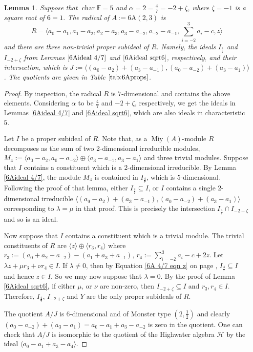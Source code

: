 \documentclass[11pt, a4paper]{article}
\theoremstyle{plain}
\newtheorem{lemma}[theorem]{Lemma}
\theoremstyle{definition}
\newcommand\al{\alpha}
\newcommand\lm{\lambda}
\newcommand\la{\langle}
\newcommand\ra{\rangle}
\DeclareMathOperator{\ch}{char}
\newcommand\FF{\mathbb{F}}
\newcommand{\A}{\mathrm{A}}
\DeclareMathOperator{\Miy}{Miy}
\newcommand{\cH}{\mathcal{H}}
\newcommand{\0}{\overline{0}}
\newcommand{\2}{\overline{2}}
\newcommand{\1}{\mathbbm{1}}
\begin{document}
\begin{lemma}
Suppose that $\ch \FF = 5$ and $\al = 2 = \tfrac{4}{7} = -2+\zeta$, where $\zeta = -1$ is a square root of $6=1$.  The radical of $A := 6\A(2, 3)$ is
\[
	R = \la a_0 -a_1, a_1-a_2, a_2-a_3, a_3-a_{-2}, a_{-2} -a_{-1}, \sum_{i=-2}^3 a_i -c, z  \ra 
\]
and there are three non-trivial proper subideal of $R$.  Namely, the ideals $I_{\frac{4}{7}}$ and $I_{-2+\zeta}$ from Lemmas $\ref{6Aideal 4/7}$ and $\ref{6Aideal sqrt6}$, respectively, and their intersection, which is $J :=  \la (a_0 -a_2)+(a_3-a_{-1}), (a_0 - a_{-2}) +  (a_3-a_1) \ra$.  The quotients are given in Table $\ref{tab:6Aprops}$.
\end{lemma}
\begin{proof}
By inspection, the radical $R$ is $7$-dimensional and contains the above elements.  Considering $\al$ to be $\frac{4}{7}$ and $-2+\zeta$, respectively, we get the ideals in Lemmas \ref{6Aideal 4/7} and \ref{6Aideal sqrt6}, which are also ideals in characteristic $5$.

Let $I$ be a proper subideal of $R$.  Note that, as a $\Miy(A)$-module $R$ decomposes as the sum of two $2$-dimensional irreducible modules, $M_4 := \la  a_0-a_2, a_0-a_{-2}\ra\oplus \la a_3-a_{-1}, a_3-a_1\ra$ and three trivial modules.  Suppose that $I$ contains a constituent which is a $2$-dimensional irreducible.  By Lemma \ref{6Aideal 4/7}, the module $M_4$ is contained in $I_{\frac{4}{7}}$, which is $5$-dimensional.  Following the proof of that lemma, either $I_{\frac{4}{7}} \subseteq I$, or $I$ contains a single $2$-dimensional irreducible $\la (a_0-a_2) + (a_3-a_{-1}), (a_0-a_{-2}) + (a_3-a_1) \ra$ corresponding to $\lm = \mu$ in that proof.  This is precisely the intersection $I_{\frac{4}{7}} \cap I_{-2+\zeta}$ and so is an ideal.

Now suppose that $I$ contains a constituent which is a trivial module.  The trivial constituents of $R$ are $\la z \ra \oplus \la r_3, r_4 \ra$ where $r_3:=(a_0 + a_2 + a_{-2}) - (a_1 + a_3 + a_{-1})$, $r_4 := \sum_{i=-2}^3 a_i - c +2z$.  Let $\lm z + \mu r_3 + \nu r_4 \in I$.  If $\lm \neq 0$, then by Equation \eqref{6A 4/7 eqn z} on page \pageref{6A 4/7 eqn z}, $I_{\frac{4}{7}} \subseteq I$ and hence $z \in I$.  So we may now suppose that $\lm =0$.  By the proof of Lemma \ref{6Aideal sqrt6}, if either $\mu$, or $\nu$ are non-zero, then $I_{-2+\zeta} \subseteq I$ and $r_3, r_4 \in I$.  Therefore, $I_{\frac{4}{7}}$, $I_{-2+\zeta}$ and $Y$ are the only proper subideals of $R$.

The quotient $A/J$ is $6$-dimensional and of Monster type $(2, \frac{1}{2})$ and clearly $(a_0-a_{-2}) + (a_3-a_1) = a_0-a_1 + a_3-a_{-2}$ is zero in the quotient.  One can check that $A/J$ is isomorphic to the quotient of the Highwater algebra $\cH$ by the ideal $\la a_0-a_1+a_3-a_4\ra$.
\end{proof}
\end{document}
